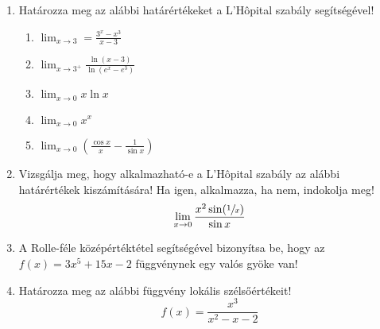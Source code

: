 \documentclass[a4paper, 12pt]{scrartcl}
\begin{document}
\begin{enumerate}
  \item Határozza meg az alábbi határértékeket a L'Hôpital szabály segítségével!
        \begin{multicols}{2}
          \begin{enumerate}
            \item $\displaystyle
                    \lim_{x \rightarrow 3} = \frac{3^x - x^3}{x - 3}
                  $

            \item $\displaystyle
                    \lim_{x \rightarrow 3^{+}} \frac{\ln(x - 3)}{\ln(e^x - e^3)}
                  $

            \item $\displaystyle
                    \lim_{x \rightarrow 0} x \ln x
                  $

            \item $\displaystyle
                    \lim_{x \rightarrow 0} x^x
                  $

            \item $\displaystyle
                    \lim_{x \rightarrow 0} \left(
                    \frac{\cos x}{x} - \frac{1}{\sin x}
                    \right)
                  $
          \end{enumerate}
        \end{multicols}

  \item Vizsgálja meg, hogy alkalmazható-e a L'Hôpital szabály az alábbi
        határértékek kiszámítására! Ha igen, alkalmazza, ha nem, indokolja meg!
        \[
          \lim_{x \rightarrow 0} \frac{x^2 \sin(\sfrac{1}{x})}{\sin x}
        \]

  \item A Rolle-féle középértéktétel segítségével bizonyítsa be, hogy az
        $f(x) = 3x^5 + 15x - 2$ függvénynek egy valós gyöke van!

  \item Határozza meg az alábbi függvény lokális szélsőértékeit!
        \[
          f(x) = \frac{x^3}{x^2 - x - 2}
        \]
\end{enumerate}

\end{document}
